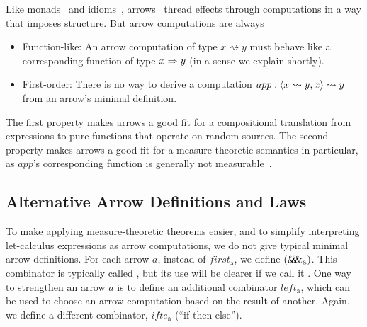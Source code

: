 \documentclass{llncs}
\newcommand{\arrow}{\rightsquigarrow}
\newcommand{\arrowpair}{\ensuremath{\mathit{\&\mspace{-7.5mu}\&\mspace{-7.5mu}\&}}}
\newcommand{\arrowif}{\ensuremath{ifte}}
\newcommand{\gen}{_\mathrm{a}}
\begin{document}
Like monads~\cite{cit:wadler-2001-monads} and idioms~\cite{cit:mcbride-2008jfp-idiom}, arrows~\cite{cit:hughes-2000scp-arrows} thread effects through computations in a way that imposes structure.
But arrow computations are always
\begin{itemize}
	\item Function-like: An arrow computation of type $x \arrow y$ must behave like a corresponding function of type $x \Rightarrow y$ (in a sense we explain shortly).
	\item First-order: There is no way to derive a computation $app : \pair{x \arrow y, x} \arrow y$ from an arrow's minimal definition.
\end{itemize}
The first property makes arrows a good fit for a compositional translation from expressions to pure functions that operate on random sources.
The second property makes arrows a good fit for a measure-theoretic semantics in particular, as $app$'s corresponding function is generally not measurable~\cite{cit:aumann-1961ijm-borel}.

\subsection{Alternative Arrow Definitions and Laws}
\label{sec:arrow-definitions}

To make applying measure-theoretic theorems easier, and to simplify interpreting let-calculus expressions as arrow computations, we do not give typical minimal arrow definitions.
For each arrow $a$, instead of $first\gen$, we define $(\arrowpair\gen)$.
This combinator is typically called , but its use will be clearer if we call it .
One way to strengthen an arrow $a$ is to define an additional combinator $left\gen$, which can be used to choose an arrow computation based on the result of another.
Again, we define a different combinator, $\arrowif\gen$ (``if-then-else'').
\end{document}

